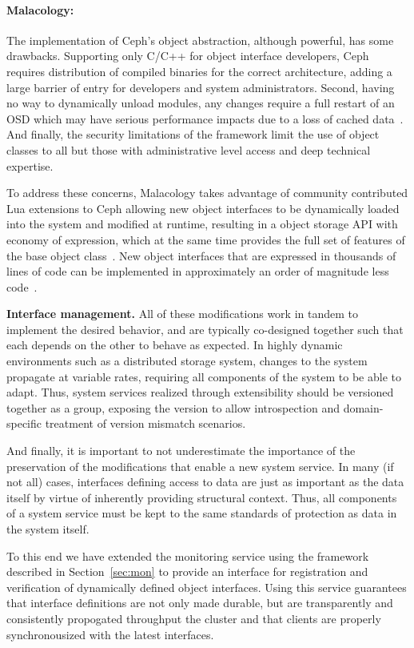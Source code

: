 \documentclass[10pt,twocolumn]{article}
\begin{document}
\paragraph*{Malacology:} The implementation of Ceph's object abstraction,
although powerful, has some drawbacks. Supporting only C/C++ for object
interface developers, Ceph requires distribution of compiled binaries for the
correct architecture, adding a large barrier of entry for developers and
system administrators. Second, having no way to dynamically unload modules,
any changes require a full restart of an OSD which may have serious
performance impacts due to a loss of cached data~\cite{facebook-mysql}. And
finally, the security limitations of the framework limit the use of object
classes to all but those with administrative level access and deep technical
expertise.

To address these concerns, Malacology takes advantage of community contributed
Lua extensions to Ceph allowing new object interfaces to be dynamically loaded
into the system and modified at runtime, resulting in a object storage API
with economy of expression, which at the same time provides the full set of
features of the base object class~\cite{bdmc}. New object interfaces that are
expressed in thousands of lines of code can be implemented in approximately an
order of magnitude less code~\cite{geambasu_comet_2010}.

{\bf Interface management.} All of these modifications work in tandem to
implement the desired behavior, and are typically co-designed together such
that each depends on the other to behave as expected. In highly dynamic
environments such as a distributed storage system, changes to the system
propagate at variable rates, requiring all components of the system to be able
to adapt. Thus, system services realized through extensibility should be
versioned together as a group, exposing the version to allow introspection and
domain-specific treatment of version mismatch scenarios.

And finally, it is important to not underestimate the importance of the
preservation of the modifications that enable a new system service. In many
(if not all) cases, interfaces defining access to data are just as important
as the data itself by virtue of inherently providing structural context. Thus,
all components of a system service must be kept to the same standards of
protection as data in the system itself.

To this end we have extended the monitoring service using the framework
described in Section~\ref{sec:mon} to provide an interface for registration
and verification of dynamically defined object interfaces. Using this service
guarantees that interface definitions are not only made durable, but are
transparently and consistently propogated throughput the cluster and that
clients are properly synchronousized with the latest interfaces.
\end{document}
